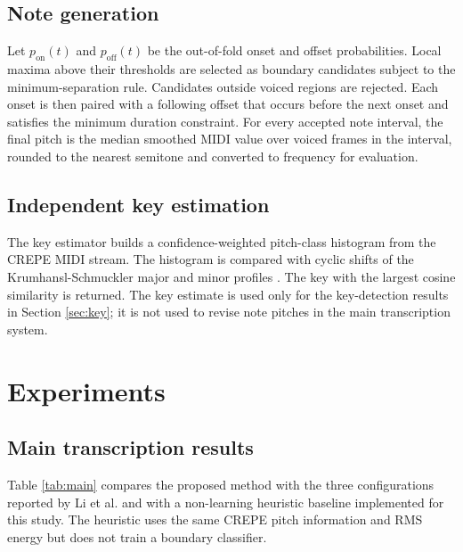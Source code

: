 \documentclass[pdflatex,sn-mathphys-num]{sn-jnl}
\begin{document}
\subsection{Note generation}

Let $p_\mathrm{on}(t)$ and $p_\mathrm{off}(t)$ be the out-of-fold onset and offset probabilities. Local maxima above their thresholds are selected as boundary candidates subject to the minimum-separation rule. Candidates outside voiced regions are rejected. Each onset is then paired with a following offset that occurs before the next onset and satisfies the minimum duration constraint. For every accepted note interval, the final pitch is the median smoothed MIDI value over voiced frames in the interval, rounded to the nearest semitone and converted to frequency for evaluation.

\subsection{Independent key estimation}

The key estimator builds a confidence-weighted pitch-class histogram from the CREPE MIDI stream. The histogram is compared with cyclic shifts of the Krumhansl-Schmuckler major and minor profiles \cite{krumhansl1982tonal}. The key with the largest cosine similarity is returned. The key estimate is used only for the key-detection results in Section \ref{sec:key}; it is not used to revise note pitches in the main transcription system.

\section{Experiments}\label{sec:experiments}

\subsection{Main transcription results}

Table \ref{tab:main} compares the proposed method with the three configurations reported by Li et al. \cite{li2021phoneme} and with a non-learning heuristic baseline implemented for this study. The heuristic uses the same CREPE pitch information and RMS energy but does not train a boundary classifier.
\end{document}
